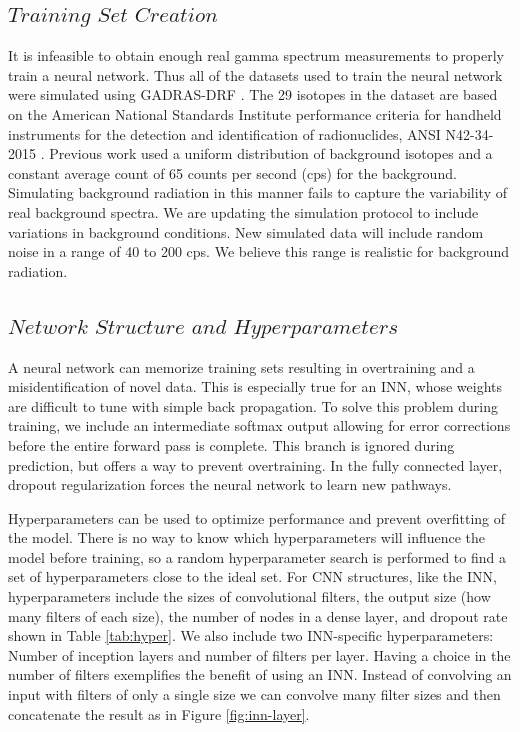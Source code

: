\documentclass[fleqn]{anstrans}
\begin{document}
\subsection{$\textit{Training Set Creation}$}
It is infeasible to obtain enough real gamma spectrum measurements to properly train a neural network. 
Thus all of the datasets used to train the neural network were simulated using GADRAS-DRF \cite{mitchellGADRASIsotopeID2014}. 
The 29 isotopes in the dataset are based on the American National Standards Institute performance criteria for handheld instruments for the detection and identification of radionuclides, ANSI N42-34-2015 \cite{AmericanNationalStandard2016}. 
Previous work \cite{kamudaComparisonMachineLearning2018a} used a uniform distribution of background isotopes and a constant average count of 65 counts per second (cps) for the background. 
Simulating background radiation in this manner fails to capture the variability of real background spectra.
We are updating the simulation protocol to include variations in background conditions. New simulated data will include random noise in a range of 40 to 200 cps. 
We believe this range is realistic for background radiation.

\subsection{$\textit{Network Structure and Hyperparameters}$}
A neural network can memorize training sets resulting in overtraining and a misidentification of novel data. 
This is especially true for an INN, whose weights are difficult to tune with simple back propagation.
To solve this problem during training, we include an intermediate softmax output allowing for error corrections before the entire forward pass is complete. 
This branch is ignored during prediction, but offers a way to prevent overtraining. 
In the fully connected layer, dropout regularization forces the neural network to learn new pathways. 

Hyperparameters can be used to optimize performance and prevent overfitting of the model.
There is no way to know which hyperparameters will influence the model before training, so a random hyperparameter search is performed to find a set of hyperparameters close to the ideal set\cite{bergstraRandomSearchHyperParameter}. 
For CNN structures, like the INN, hyperparameters include the sizes of convolutional filters, the output size (how many filters of each size), the number of nodes in a dense layer, and dropout rate \cite{kamudaMachineLearningApproach2018} shown in Table \ref{tab:hyper}. We also include two INN-specific hyperparameters: Number of inception layers and number of filters per layer. Having a choice in the number of filters exemplifies the benefit of using an INN. Instead of convolving an input with filters of only a single size we can convolve many filter sizes and then concatenate the result as in Figure \ref{fig:inn-layer}.
\end{document}
